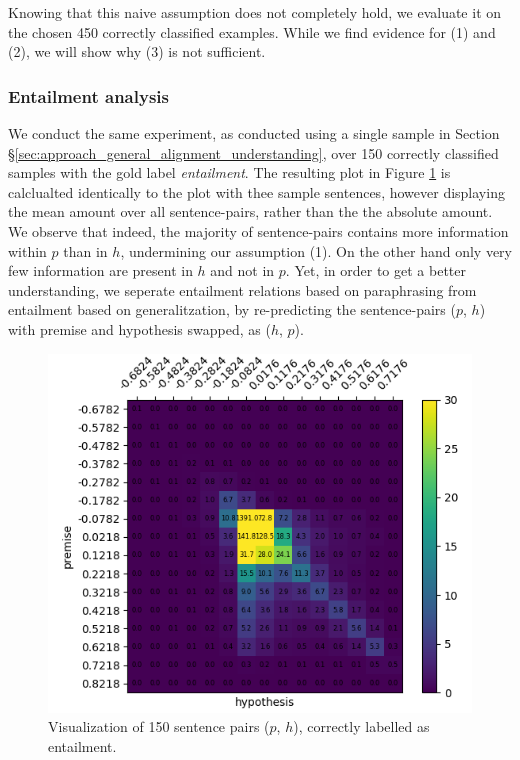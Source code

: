 Knowing that this naive assumption does not completely hold, we evaluate it on the chosen 450 correctly classified examples. While we find evidence for (1) and (2), we will show why (3) is not sufficient. 

\subsubsection{Entailment analysis}
We conduct the same experiment, as conducted using a single sample in Section §\ref{sec:approach_general_alignment_understanding}, over 150 correctly classified samples with the gold label \textit{entailment}. The resulting plot in Figure \ref{fig:entailment_uninversed} is calclualted identically to the plot with thee sample sentences, however displaying the mean amount over all sentence-pairs, rather than the the absolute amount. We observe that indeed, the majority of sentence-pairs contains more information within $p$ than in $h$, undermining our  assumption (1). On the other hand only very few information are present in $h$ and not in $p$. Yet, in order to get a better understanding, we seperate entailment relations based on paraphrasing from entailment based on generalitzation, by re-predicting the sentence-pairs ($p$, $h$) with premise and hypothesis swapped, as ($h$, $p$). 
\begin{figure}[tph!]	\centering
\includegraphics[totalheight=6.5cm]{fig/entailment_uninversed.png}
	\caption{Visualization of 150 sentence pairs ($p$, $h$), correctly labelled as entailment.}
	\label{fig:entailment_uninversed}
\end{figure}
